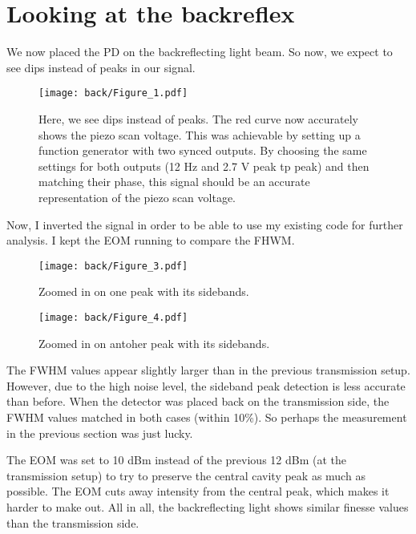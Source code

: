 \section{Looking at the backreflex}
We now placed the PD on the backreflecting light beam. So now, we expect to see dips instead of peaks in our signal.


\begin{figure}[htbp]
    \centering
    \texttt{[image: back/Figure\_1.pdf]}
    \caption{Here, we see dips instead of peaks. The red curve now accurately shows the piezo scan voltage. This was achievable by setting up a function generator with two synced outputs. By choosing the same settings for both outputs (12 Hz and 2.7 V peak tp peak) and then matching their phase, this signal should be an accurate representation of the piezo scan voltage.}
\end{figure}
Now, I inverted the signal in order to be able to use my existing code for further analysis. I kept the EOM running to compare the FHWM.

\begin{figure}[htbp]
    \centering
    \texttt{[image: back/Figure\_3.pdf]}
    \caption{Zoomed in on one peak with its sidebands.}
\end{figure}
\begin{figure}[htbp]
    \centering
    \texttt{[image: back/Figure\_4.pdf]}
    \caption{Zoomed in on antoher peak with its sidebands.}
\end{figure}

The FWHM values appear slightly larger than in the previous transmission setup.
However, due to the high noise level, the sideband peak detection is less accurate than before.
When the detector was placed back on the transmission side, the FWHM values matched in both cases (within 10\%). 
So perhaps the measurement in the previous section was just lucky.

The EOM was set to 10 dBm instead of the previous 12 dBm (at the transmission setup) to try to preserve the central cavity peak as much as possible. 
The EOM cuts away intensity from the central peak, which makes it harder to make out.
All in all, the backreflecting light shows similar finesse values than the transmission side. 
